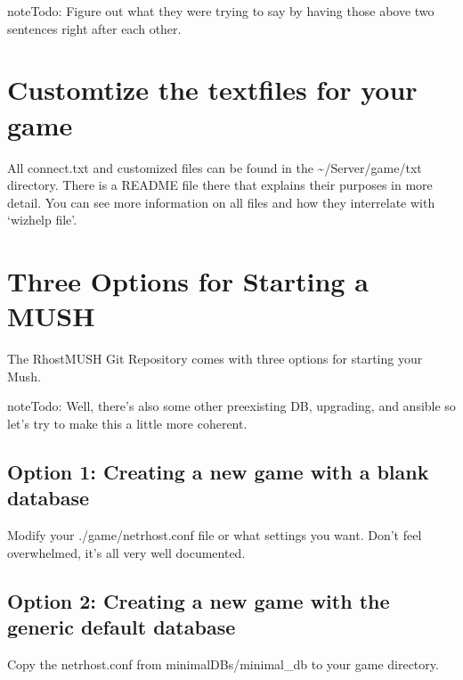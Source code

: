 \documentclass[letterpaper,10pt,english]{sphinxmanual}
\begin{document}
\begin{sphinxadmonition}{note}{\label{\detokenize{install:id7}}Todo:}
\sphinxAtStartPar
Figure out what they were trying to say by having those above two sentences right after each other.
\end{sphinxadmonition}


\section{Customtize the textfiles for your game}
\label{\detokenize{install:customtize-the-textfiles-for-your-game}}
\sphinxAtStartPar
All connect.txt and customized files can be found in the \textasciitilde{}/Server/game/txt directory.  There is a
README file there that explains their purposes in more detail.  You can see more information on
all files and how they inter\sphinxhyphen{}relate with ‘wizhelp file’.


\section{Three Options for Starting a MUSH}
\label{\detokenize{install:three-options-for-starting-a-mush}}
\sphinxAtStartPar
The RhostMUSH Git Repository comes with three options for starting your Mush.

\begin{sphinxadmonition}{note}{\label{\detokenize{install:id8}}Todo:}
\sphinxAtStartPar
Well, there’s also some other pre\sphinxhyphen{}existing DB, upgrading, and ansible so let’s try to make this a little more coherent.
\end{sphinxadmonition}


\subsection{Option 1: Creating a new game with a blank database}
\label{\detokenize{install:option-1-creating-a-new-game-with-a-blank-database}}
\sphinxAtStartPar
Modify your ./game/netrhost.conf file or what settings you want.
Don’t feel overwhelmed, it’s all very well documented.


\subsection{Option 2: Creating a new game with the generic default database}
\label{\detokenize{install:option-2-creating-a-new-game-with-the-generic-default-database}}
\sphinxAtStartPar
Copy the netrhost.conf from minimal\sphinxhyphen{}DBs/minimal\_db to your game directory.
\end{document}
